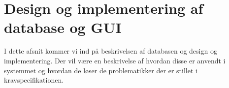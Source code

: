 
\section{Design og implementering af database og GUI}
I dette afsnit kommer vi ind på beskrivelsen af databasen og  design og implementering. Der vil være en beskrivelse af hvordan disse er anvendt i systemmet og hvordan de løser de problematikker der er stillet i kravspecifikationen.\\






